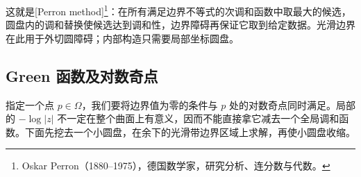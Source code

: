 这就是[Perron method]\footnote{Oskar Perron（1880--1975），德国数学家，研究分析、连分数与代数。}：在所有满足边界不等式的次调和函数中取最大的候选，圆盘内的调和替换使候选达到调和性，边界障碍再保证它取到给定数据。光滑边界在此用于外切圆障碍；内部构造只需要局部坐标圆盘。

\subsection{Green 函数及对数奇点}
\label{g4:subsec:0501:03}

指定一个点 \(p\in\Omega\)，我们要将边界值为零的条件与 \(p\) 处的对数奇点同时满足。局部的 \(-\log|z|\) 不一定在整个曲面上有意义，因而不能直接拿它减去一个全局调和函数。下面先挖去一个小圆盘，在余下的光滑带边界区域上求解，再使小圆盘收缩。

